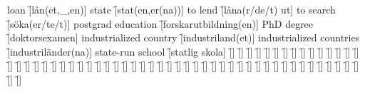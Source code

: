 \begin{questions}
\begin{multicols}{2}
        \question loan \f[lån(et,\_,en)]
        \question state \f[stat(en,er(na))]
        \question to lend \f[låna(r/de/t) ut]
        \question to search \f[söka(er/te/t)]
        \question postgrad education \f[forskarutbildning(en)]
        \question PhD degree \f[doktorsexamen]
        \question industrialized country \f[industriland(et)]
        \question industrialized countries \f[industriländer(na)]
        \question state-run school \f[statlig skola]
        \question  \f[]
        \question  \f[]
        \question  \f[]
        \question  \f[]
        \question  \f[]
        \question  \f[]
        \question  \f[]
        \question  \f[]
        \question  \f[]
        \question  \f[]
        \question  \f[]
        \question  \f[]
        \question  \f[]
        \question  \f[]
        \question  \f[]
        \question  \f[]
        \question  \f[]
        \question  \f[]
        \question  \f[]
        \question  \f[]
        \question  \f[]
        \question  \f[]
        \question  \f[]
        \question  \f[]
        \question  \f[]
        \question  \f[]
        \question  \f[]
        \question  \f[]
        \question  \f[]
        \question  \f[]
        \question  \f[]
        \question  \f[]
        \question  \f[]
        \question  \f[]
        \question  \f[]
        \question  \f[]
        \question  \f[]
        \question  \f[]
        \question  \f[]
        \question  \f[]
        \question  \f[]
        \question  \f[]
        \question  \f[]
        \question  \f[]
        \question  \f[]
        \question  \f[]
        \question  \f[]
        \question  \f[]
        \question  \f[]
        \question  \f[]
        \question  \f[]
        \question  \f[]
        \question  \f[]
        \question  \f[]
        \question  \f[]
        \question  \f[]
        \question  \f[]
    \end{multicols}
\end{questions}
